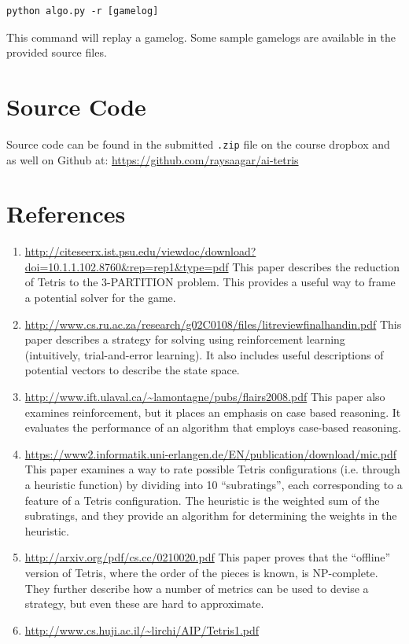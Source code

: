 \documentclass[11pt]{article}
\begin{document}
\begin{verbatim}
python algo.py -r [gamelog]
\end{verbatim}
This command will replay a gamelog. Some sample gamelogs are available in the provided source files.

\section{Source Code}   
Source code can be found in the submitted \verb|.zip| file on the course dropbox and as well on Github at: \url{https://github.com/raysaagar/ai-tetris}

\section{References}
\begin{enumerate}
\item \url{http://citeseerx.ist.psu.edu/viewdoc/download?doi=10.1.1.102.8760&rep=rep1&type=pdf}
This paper describes the reduction of Tetris to the 3-PARTITION problem. This provides a useful way to frame a potential solver for the game.
\item \url{http://www.cs.ru.ac.za/research/g02C0108/files/litreviewfinalhandin.pdf}
This paper describes a strategy for solving using reinforcement learning (intuitively, trial-and-error learning). It also includes useful descriptions of potential vectors to describe the state space.
\item \url{http://www.ift.ulaval.ca/~lamontagne/pubs/flairs2008.pdf}
This paper also examines reinforcement, but it places an emphasis on case based reasoning. It evaluates the performance of an algorithm that employs case-based reasoning.
\item \url{https://www2.informatik.uni-erlangen.de/EN/publication/download/mic.pdf}
This paper examines a way to rate possible Tetris configurations (i.e. through a heuristic function) by dividing into 10 “subratings”, each corresponding to a feature of a Tetris configuration. The heuristic is the weighted sum of the subratings, and they provide an algorithm for determining the weights in the heuristic.
\item   \url{http://arxiv.org/pdf/cs.cc/0210020.pdf}
This paper proves that the “offline” version of Tetris, where the order of the pieces is known, is NP-complete. They further describe how a number of metrics can be used to devise a strategy, but even these are hard to approximate.
\item \url{http://www.cs.huji.ac.il/~lirchi/AIP/Tetris1.pdf}

\end{enumerate}
\end{document}

